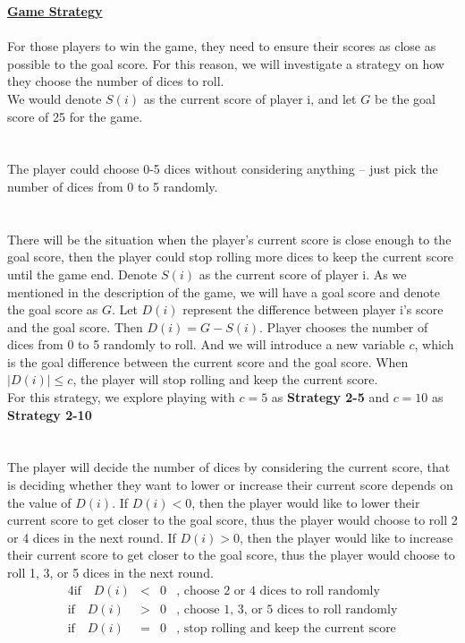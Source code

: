 \documentclass[12pt]{article}
\begin{document}
\noindent \underline{\textbf{Game Strategy}} \\\\
For those players to win the game, they need to ensure their scores as close as possible to the goal score. For this reason, we will investigate a strategy on how they choose the number of dices to roll.\\
We would denote $S(i)$ as the current score of player i, and let $G$ be the goal score of 25 for the game.\\\\
\\
The player could choose 0-5 dices without considering anything -- just pick the number of dices from 0 to 5 randomly. \\\\ 
\\
There will be the situation when the player's current score is close enough to the goal score, then the player could stop rolling more dices to keep the current score until the game end. Denote $S(i)$ as the current score of player i. As we mentioned in the description of the game, we will have a goal score and denote the goal score as $G$. Let $D(i)$ represent the difference between player i's score and the goal score. Then $D(i)=G-S(i)$. Player chooses the number of dices from 0 to 5 randomly to roll. And we will introduce a new variable $c$, which is the goal difference between the current score and the goal score. When $|D(i)| \leq c$, the player will stop rolling and keep the current score.\\
For this strategy, we explore playing with $c=5$ as \textbf{Strategy 2-5} and $c=10$ as \textbf{Strategy 2-10}\\\\
\\
The player will decide the number of dices by considering the current score, that is deciding whether they want to lower or increase their current score depends on the value of $D(i)$.  If $D(i)<0$, then the player would like to lower their current score to get closer to the goal score, thus the player would choose to roll 2 or 4 dices in the next round. If $D(i)>0$, then the player would like to increase their current score to get closer to the goal score, thus the player would choose to roll 1, 3, or 5 dices in the next round.
\begin{alignat*}{4}
   \text{if} \quad D(i) & {}<{} & 0 & \text{, choose 2 or 4 dices to roll randomly} \\
   \text{if} \quad D(i) & {}>{} & 0 & \text{, choose 1, 3, or 5 dices to roll randomly}\\
   \text{if} \quad D(i) & {}={} & 0 & \text{, stop rolling and keep the current score}
\end{alignat*}
\end{document}

